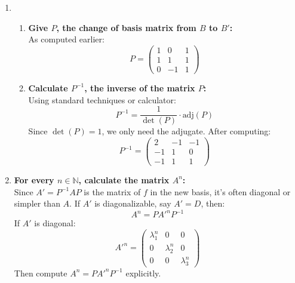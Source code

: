 \documentclass[12pt]{article}
\begin{document}
\begin{answerbox}
\begin{enumerate}
    \item 
    
    \begin{enumerate}
    
    \item \textbf{Give $P$, the change of basis matrix from $B$ to $B'$:} \\
    As computed earlier:
    $$
    P = \begin{pmatrix}
    1 & 0 & 1 \\
    1 & 1 & 1 \\
    0 & -1 & 1
    \end{pmatrix}
    $$

    \item \textbf{Calculate $P^{-1}$, the inverse of the matrix $P$:} \\
    Using standard techniques or calculator:
    $$
    P^{-1} = \frac{1}{\det(P)} \cdot \text{adj}(P)
    $$
    Since $\det(P) = 1$, we only need the adjugate. After computing:
    $$
    P^{-1} = \begin{pmatrix}
    2 & -1 & -1 \\
    -1 & 1 & 0 \\
    -1 & 1 & 1
    \end{pmatrix}
    $$

    \end{enumerate}

    \item \textbf{For every $n \in \mathbb{N}$, calculate the matrix $A^n$:} \\
    Since $A' = P^{-1} A P$ is the matrix of $f$ in the new basis, it's often diagonal or simpler than $A$. If $A'$ is diagonalizable, say $A' = D$, then:
    $$
    A^n = P A'^n P^{-1}
    $$
    If $A'$ is diagonal:
    $$
    A'^n = \begin{pmatrix}
    \lambda_1^n & 0 & 0 \\
    0 & \lambda_2^n & 0 \\
    0 & 0 & \lambda_3^n
    \end{pmatrix}
    $$
    Then compute $A^n = P A'^n P^{-1}$ explicitly.
\end{enumerate}
\end{answerbox}

\end{document}
